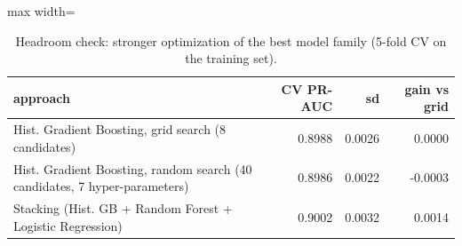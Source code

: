 \begin{table}[H]
\centering
\small
\begin{adjustbox}{max width=\linewidth}
\begin{tabular}{p{8.2cm}rrr}
\toprule
approach & CV PR-AUC & sd & gain vs grid \\
\midrule
Hist. Gradient Boosting, grid search (8 candidates) & 0.8988 & 0.0026 & 0.0000 \\
Hist. Gradient Boosting, random search (40 candidates, 7 hyper-parameters) & 0.8986 & 0.0022 & -0.0003 \\
Stacking (Hist. GB + Random Forest + Logistic Regression) & 0.9002 & 0.0032 & 0.0014 \\
\bottomrule
\end{tabular}
\end{adjustbox}
\caption{Headroom check: stronger optimization of the best model family (5-fold CV on the training set).}
\label{tab:headroom}
\end{table}
